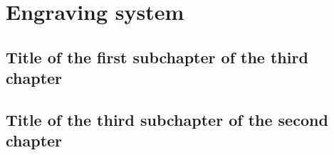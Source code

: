 \chapter{Engraving system}
\label{ChapterEngravingSystem}

\section{Title of the first subchapter of the third chapter}

\section{Title of the third subchapter of the second chapter}
